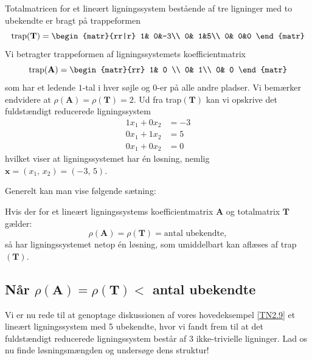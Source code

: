 \begin{example}
Totalmatricen for et lineært ligningssystem bestående af tre ligninger med to ubekendte er bragt på trappeformen
\begin{equation}
\mathrm{trap}(\mathbf T)=
\begin{matr}{rr|r}
 1& 0&-3\\
 0& 1&5\\
 0& 0&0
\end{matr}
\end{equation}
Vi betragter trappeformen af ligningssystemets koefficientmatrix
\begin{equation}
\mathrm{trap}(\mathbf A)=
\begin{matr}{rr}
 1& 0 \\
 0& 1\\
 0& 0
\end{matr}
\end{equation}
som har et ledende $1$-tal i hver søjle og $0$-er på alle andre pladser. Vi bemærker endvidere at $\rho(\mathbf A)=\rho(\mathbf T)=2$.\bs 
Ud fra trap$(\mathbf T)$ kan vi opskrive det fuldstændigt reducerede ligningssystem
\begin{equation}
\begin{aligned}
1x_1+0x_2&=-3\\
0x_1+1x_2&=5\\
0x_1+0x_2&=0
\end{aligned}
\end{equation}
hvilket viser at ligningssystemet har én løsning, nemlig $\mathbf x = (x_1,\,x_2)=(-3,\,5)$.
\end{example}

Generelt kan man vise følgende sætning:

\begin{theorem}[Når $\rho(\mathbf A)= \rho(\mathbf T) = $ antal ubekendte]\label{TN2.11c}
Hvis der for et lineært ligningssystems koefficientmatrix $\mathbf A$ og totalmatrix $\mathbf T$ gælder:
\begin{equation}
\rho(\mathbf A)= \rho(\mathbf T)=\textrm{antal ubekendte},
\end{equation}
så har ligningssystemet netop én løsning, som umiddelbart kan aflæses af trap$(\mathbf T)$.
\end{theorem}

\subsection{Når $ \rho(\mathbf A)=\rho(\mathbf T) < $ antal ubekendte}
Vi er nu rede til at genoptage diskussionen af vores hovedeksempel \ref{TN2.9} et lineært lig\-nings\-sy\-stem med 5 ubekendte, hvor vi fandt frem til at det fuldstændigt reducerede ligningssystem består af 3 ikke-trivielle ligninger. Lad os nu finde løsningsmængden og undersøge dens struktur!


